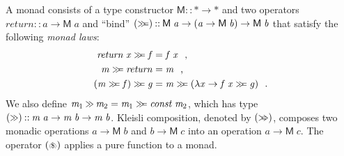 \documentclass{llncs}
\newcommand{\Conid}[1]{\mathit{#1}}
\newcommand{\Varid}[1]{\mathit{#1}}
\let\Varid\mathit
\let\Conid\mathsf
\begin{document}
A monad consists of a type constructor \ensuremath{\Conid{M}\mathbin{::}\mathbin{*}\to \mathbin{*}} and two operators \ensuremath{\Varid{return}\mathbin{::}\Varid{a}\to \Conid{M}\;\Varid{a}} and ``bind'' \ensuremath{(\mathrel{\hstretch{0.7}{>\!\!>\!\!=}})\mathbin{::}\Conid{M}\;\Varid{a}\to (\Varid{a}\to \Conid{M}\;\Varid{b})\to \Conid{M}\;\Varid{b}} that satisfy the following {\em monad laws}:
\begin{align}
  \ensuremath{\Varid{return}\;\Varid{x}\mathrel{\hstretch{0.7}{>\!\!>\!\!=}}\Varid{f}} &= \ensuremath{\Varid{f}\;\Varid{x}}\mbox{~~,} \label{eq:monad-bind-ret}\\
  \ensuremath{\Varid{m}\mathrel{\hstretch{0.7}{>\!\!>\!\!=}}\Varid{return}} &= \ensuremath{\Varid{m}} \mbox{~~,} \label{eq:monad-ret-bind}\\
  \ensuremath{(\Varid{m}\mathrel{\hstretch{0.7}{>\!\!>\!\!=}}\Varid{f})\mathrel{\hstretch{0.7}{>\!\!>\!\!=}}\Varid{g}} &= \ensuremath{\Varid{m}\mathrel{\hstretch{0.7}{>\!\!>\!\!=}}(\lambda \Varid{x}\to \Varid{f}\;\Varid{x}\mathrel{\hstretch{0.7}{>\!\!>\!\!=}}\Varid{g})} \mbox{~~.}
    \label{eq:monad-assoc}
\end{align}
We also define \ensuremath{\Varid{m}_{1}\mathbin{\hstretch{0.7}{>\!\!>}}\Varid{m}_{2}\mathrel{=}\Varid{m}_{1}\mathrel{\hstretch{0.7}{>\!\!>\!\!=}}\Varid{const}\;\Varid{m}_{2}}, which has type \ensuremath{(\mathbin{\hstretch{0.7}{>\!\!>}})\mathbin{::}\Varid{m}\;\Varid{a}\to \Varid{m}\;\Varid{b}\to \Varid{m}\;\Varid{b}}.
Kleisli composition, denoted by \ensuremath{(\mathrel{\hstretch{0.7}{>\!\!=\!\!\!>}})}, composes two monadic operations \ensuremath{\Varid{a}\to \Conid{M}\;\Varid{b}} and \ensuremath{\Varid{b}\to \Conid{M}\;\Varid{c}} into an operation \ensuremath{\Varid{a}\to \Conid{M}\;\Varid{c}}.
The operator \ensuremath{(\mathrel{\raisebox{0.5\depth}{\scaleobj{0.5}{\langle}} \scaleobj{0.8}{\$} \raisebox{0.5\depth}{\scaleobj{0.5}{\rangle}}})} applies a pure function to a monad.
%
%
\end{document}
